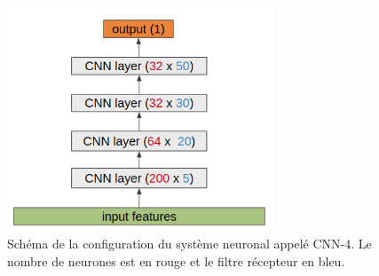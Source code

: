\begin{figure}[thb]
  \centering
    \includegraphics[width=8cm]{./Chapitre5/figures/CNN.png}
    \caption{Schéma de la configuration du système neuronal appelé CNN-4. Le nombre de neurones est en rouge et le filtre récepteur en bleu.}
    \label{fig:CNN}
\end{figure}
